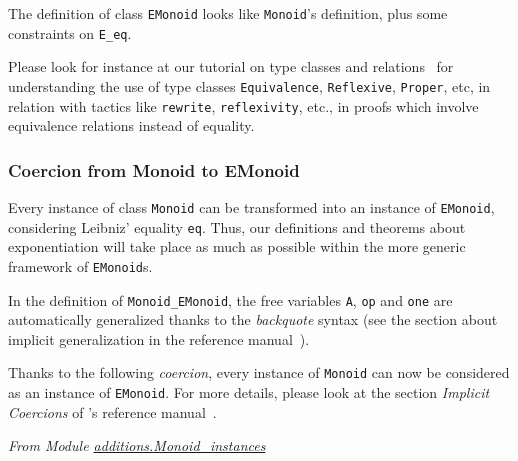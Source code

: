 
The definition of class \texttt{EMonoid} looks like \texttt{Monoid}'s definition, 
plus some constraints on \texttt{E\_eq}.

Please look for instance at our tutorial on type classes and relations~\cite{PCMS} 
for understanding the use of  type classes \texttt{Equivalence}, \texttt{Reflexive}, \texttt{Proper}, etc, in relation with tactics like \texttt{rewrite}, \texttt{reflexivity}, etc., in proofs which involve  equivalence relations instead of equality.

\label{EMonoid-def}

 



\subsubsection{Coercion from Monoid to EMonoid} 
Every instance of class  \texttt{Monoid} can be transformed into an instance of
\texttt{EMonoid}, considering Leibniz' equality \texttt{eq}.
Thus, our  definitions and theorems about exponentiation will take place as 
much as possible within the more generic framework of \texttt{EMonoid}s.





\begin{remark}
In the definition of \texttt{Monoid\_EMonoid}, the free variables  \texttt{A}, 
\texttt{op} and \texttt{one} are automatically generalized thanks to the \emph{backquote} syntax (see the section about implicit generalization in the reference manual~\cite{Coq}).
\end{remark}

Thanks to the following \emph{coercion}, every instance of \texttt{Monoid} can 
now be considered as an instance of \texttt{EMonoid}. For more details, please look at the section \emph{Implicit Coercions} of \coq's reference manual~\cite{Coq}.


\emph{From Module \href{../theories/html/additions.Monoid_instances.html}{additions.Monoid\_instances}}

